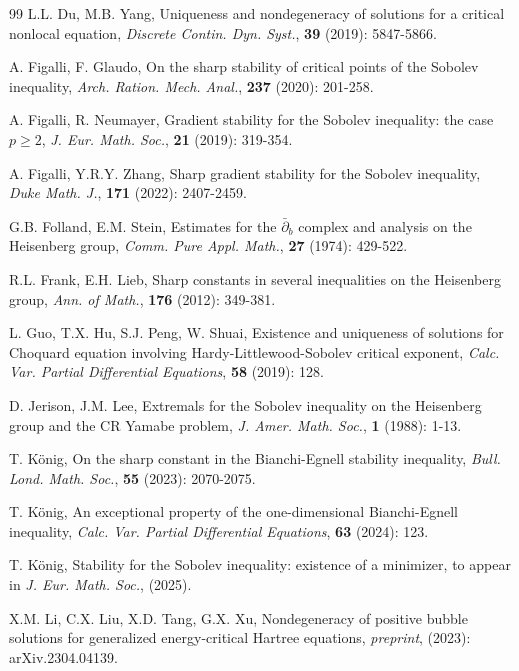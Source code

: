 \documentclass[11pt]{article}
\begin{document}
\begin{thebibliography}{99}
 L.L. Du, M.B. Yang,
Uniqueness and nondegeneracy of solutions for a critical nonlocal equation,
{\em Discrete Contin. Dyn. Syst.}, {\bf 39} (2019): 5847-5866.

 A. Figalli, F. Glaudo,
On the sharp stability of critical points of the Sobolev inequality,
{\em Arch. Ration. Mech. Anal.}, {\bf 237} (2020): 201-258.

 A. Figalli, R. Neumayer,
Gradient stability for the Sobolev inequality: the case $p\geq2$, {\em J. Eur. Math. Soc.},
{\bf 21} (2019): 319-354.

 A. Figalli, Y.R.Y. Zhang,
Sharp gradient stability for the Sobolev inequality,
{\em Duke Math. J.}, {\bf 171} (2022): 2407-2459.

 G.B. Folland, E.M. Stein,
Estimates for the $\bar{\partial}_b$ complex and analysis on the Heisenberg group,
{\em Comm. Pure Appl. Math.}, {\bf 27}
(1974): 429-522.

 R.L. Frank, E.H. Lieb,
Sharp constants in several inequalities on the Heisenberg group,
{\em Ann. of Math.}, {\bf 176} (2012): 349-381.




 L. Guo, T.X. Hu, S.J. Peng, W. Shuai,
Existence and uniqueness of solutions for Choquard equation involving Hardy-Littlewood-Sobolev critical exponent, {\em Calc. Var. Partial Differential Equations}, {\bf 58} (2019): 128.


 D. Jerison, J.M. Lee,
Extremals for the Sobolev inequality on the Heisenberg group and the CR Yamabe problem,
{\em J. Amer. Math. Soc.}, {\bf 1} (1988): 1-13.

T. K\"{o}nig, On the sharp constant in the Bianchi-Egnell stability inequality,
{\em Bull. Lond. Math. Soc.}, {\bf 55} (2023): 2070-2075.

 T. K\"{o}nig,
An exceptional property of the one-dimensional Bianchi-Egnell inequality, {\em Calc. Var. Partial Differential Equations}, {\bf 63} (2024): 123.

T. K\"{o}nig, Stability for the Sobolev inequality: existence of a minimizer, to appear in
{\em J. Eur. Math. Soc.}, (2025).

 X.M. Li, C.X. Liu, X.D. Tang, G.X. Xu,
Nondegeneracy of positive bubble solutions for generalized energy-critical Hartree equations, {\em preprint},
(2023): arXiv.2304.04139.


\end{thebibliography}
\end{document}
